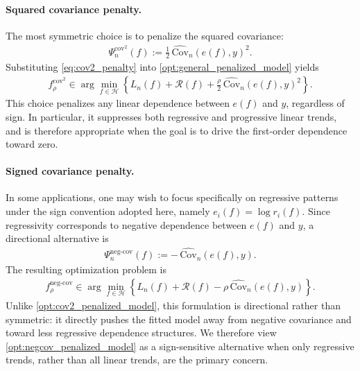\documentclass[12pt, draft]{article}
\theoremstyle{plain}
\theoremstyle{definition}
\newcommand{\1}{\mathbf{1}}
\newcommand{\Cov}{\text{Cov}}
\renewcommand{\H}{\mathcal{H}}
\begin{document}
\paragraph{Squared covariance penalty.}
The most symmetric choice is to penalize the squared covariance:
\begin{align}
    \label{eq:cov2_penalty}
    \Psi_n^{\mathrm{cov}^2}(f)
    :=
    \frac{1}{2}\,
    \widehat{\Cov}_n(e(f),y)^2.
\end{align}
Substituting \eqref{eq:cov2_penalty} into \eqref{opt:general_penalized_model} yields
\begin{align}
    \label{opt:cov2_penalized_model}
    f_{\rho}^{\mathrm{cov}^2}
    \in
    \arg\min_{f\in\H}
    \left\{
        L_n(f)+\mathcal{R}(f)
        +
        \frac{\rho}{2}\,\widehat{\Cov}_n(e(f),y)^2
    \right\}.
\end{align}
This choice penalizes any linear dependence between $e(f)$ and $y$, regardless of sign. In particular, it suppresses both regressive and progressive linear trends, and is therefore appropriate when the goal is to drive the first-order dependence toward zero.

\paragraph{Signed covariance penalty.}
In some applications, one may wish to focus specifically on regressive patterns under the sign convention adopted here, namely $e_i(f)=\log r_i(f)$. Since regressivity corresponds to negative dependence between $e(f)$ and $y$, a directional alternative is
\begin{align}
    \label{eq:negcov_penalty}
    \Psi_n^{\mathrm{neg\mbox{-}cov}}(f)
    :=
    -\,\widehat{\Cov}_n(e(f),y).
\end{align}
The resulting optimization problem is
\begin{align}
    \label{opt:negcov_penalized_model}
    f_{\rho}^{\mathrm{neg\mbox{-}cov}}
    \in
    \arg\min_{f\in\H}
    \left\{
        L_n(f)+\mathcal{R}(f)
        -
        \rho\,\widehat{\Cov}_n(e(f),y)
    \right\}.
\end{align}
Unlike \eqref{opt:cov2_penalized_model}, this formulation is directional rather than symmetric: it directly pushes the fitted model away from negative covariance and toward less regressive dependence structures. We therefore view \eqref{opt:negcov_penalized_model} as a sign-sensitive alternative when only regressive trends, rather than all linear trends, are the primary concern.
\end{document}
